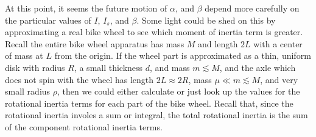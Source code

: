 \documentclass[10pt]{article}
\begin{document}
At this point, it seems the future motion of $\alpha$, and $\beta$ depend 
more carefully on the particular values of $I$, $I_s$, and $\beta$. 
Some light could be shed on this by approximating a real bike wheel to see 
which moment of inertia term is greater. Recall the entire 
bike wheel apparatus has mass $M$ and length $2L$ with a center of 
mass at $L$ from the origin. If the wheel part is 
approximated as a thin, uniform disk with radius $R$, a small
thickness $d$, and mass $m\lesssim M$, and the axle which does not 
spin with the wheel has length $2L\approx2R$, mass $\mu\ll m\lesssim M$, and 
very small radius $\rho$, then we could either calculate or just look 
up the values for the rotational inertia terms for each part of the 
bike wheel. Recall that, since the rotational inertia involes 
a sum or integral, the total rotational inertia is the sum of the component 
rotational inertia terms.
\end{document}
